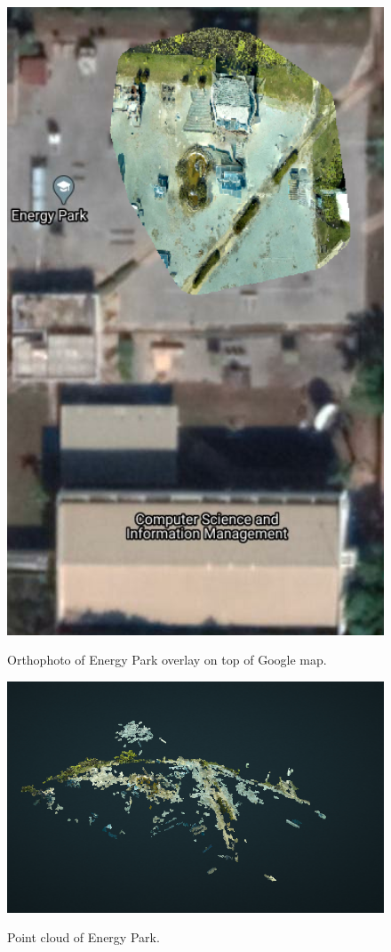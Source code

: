 \begin{figure}
	\centering
	\caption[Orthophoto of Energy Park.]{\small Orthophoto of Energy Park overlay on top of Google map.} 
	\includegraphics[width=5in]{figures/experiment/orthophoto}
	\label{fig:orthophoto-real}
\end{figure}

\begin{figure}
	\centering
	\caption[Point cloud of Energy Park.]{\small Point cloud of Energy Park.} 
	\includegraphics[width=5in]{figures/experiment/point-cloud}
	\label{fig:real-pointcloud}
\end{figure}

